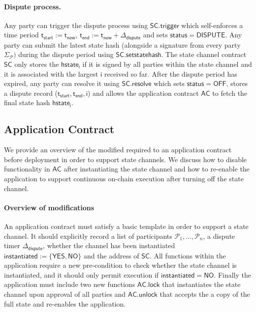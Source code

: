 \documentclass{article}
\newcommand{\instantiated}{\mathsf{instantiated}}
\newcommand{\instantiatedno}{\mathsf{NO}}
\newcommand{\instantiatedyes}{\mathsf{YES}}
\newcommand{\chanstatus}{\mathsf{status}}
\newcommand{\chandispute}{\mathsf{DISPUTE}}
\newcommand{\chanoff}{\mathsf{OFF}}
\newcommand{\hstatei}{\mathsf{hstate}_{\monotoniccounter}}
\newcommand{\monotoniccounter}{\mathsf{i}}
\newcommand{\participant}{\mathcal{P}}
\newcommand{\statechannel}{\mathsf{SC}}
\newcommand{\statechanneldispute}{\mathsf{SC}.\mathsf{trigger}}
\newcommand{\statechannelsetstate}{\mathsf{SC}.\mathsf{setstatehash}}
\newcommand{\statechannelresolve}{\mathsf{SC}.\mathsf{resolve}}
\newcommand{\appcontract}{\mathsf{AC}}
\newcommand{\applock}{\mathsf{AC.lock}}
\newcommand{\appunlock}{\mathsf{AC.unlock}}
\newcommand{\timerdispute}{\mathsf{\Delta}_{\mathsf{dispute}}}
\newcommand{\timenow}{\mathsf{t}_{\mathsf{now}}}
\newcommand{\timestart}{\mathsf{t}_{\mathsf{start}}}
\newcommand{\timeend}{\mathsf{t}_{\mathsf{end}}}
\newcommand{\timedispute}{\timenow + \mathsf{\Delta}_{\mathsf{dispute}}}
\begin{document}
\paragraph{Dispute process.} 

Any party can trigger the dispute process using $\statechanneldispute$ which self-enforces a time period $\timestart := \timenow$, $\timeend := \timedispute$ and sets $\chanstatus = \chandispute$. 
Any party can submit the latest state hash (alongside a signature from every party $\Sigma_{\participant})$ during the dispute period using $\statechannelsetstate$. 
The state channel contract $\statechannel$ only stores the $\hstatei$ if it is  signed by all parties within the state channel and it is  associated with the largest $\monotoniccounter$ received so far. 
After the dispute period has expired, any party can resolve it using $\statechannelresolve$ which sets $\chanstatus = \chanoff$, stores a dispute record ($\timestart,\timeend, \monotoniccounter$) and allows the application contract $\appcontract$ to fetch the final state hash $\hstatei$. 

\subsection{Application Contract}

We provide an overview of the modified required to an application contract before deployment in order to support state channels. We discuss how to disable functionality in $\appcontract$ after instantiating the state channel and how to re-enable the application to support continuous on-chain execution after turning off the state channel. 

\paragraph{Overview of modifications}
An application contract must satisfy a basic template in order to support a state channel. 
It should explicitly record a list of participants $\participant_{1},...,\participant_{n}$, a dispute timer $\timerdispute$, whether the channel has been instantiated  $\instantiated := \{\instantiatedyes, \instantiatedno\}$ and the address of $\statechannel$. 
All functions within the application require a new pre-condition to check whether the state channel is instantiated, and it should only permit execution if $\instantiated = \instantiatedno$. 
Finally the application must include two new functions $\applock$ that instantiates the state channel upon approval of all parties and $\appunlock$ that accepts the a copy of the full state and re-enables the application. 
\end{document}
